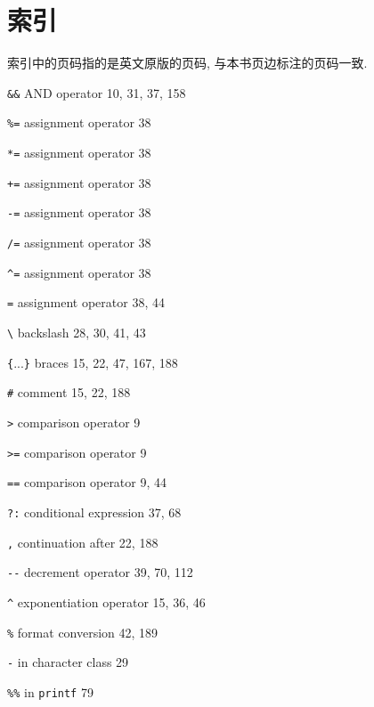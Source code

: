 \chapter{索引}
\label{chap:index}

索引中的页码指的是英文原版的页码, 与本书页边标注的页码一致.

\begin{multicols}{3}
\small
\hangindent=3pc  \verb'&&' AND operator 10, 31, 37, 158

\hangindent=3pc  \verb'%=' assignment operator 38

\hangindent=3pc  \verb'*=' assignment operator 38

\hangindent=3pc  \verb'+=' assignment operator 38

\hangindent=3pc  \verb'-=' assignment operator 38

\hangindent=3pc  \verb'/=' assignment operator 38

\hangindent=3pc  \verb'^=' assignment operator 38

\hangindent=3pc  \verb'=' assignment operator 38, 44

\hangindent=3pc  \verb'\' backslash 28, 30, 41, 43

\hangindent=3pc  \verb'{'...\verb'}' braces 15, 22, 47, 167, 188

\hangindent=3pc  \verb'#' comment 15, 22, 188

\hangindent=3pc  \verb'>' comparison operator 9

\hangindent=3pc  \verb'>=' comparison operator 9

\hangindent=3pc  \verb'==' comparison operator 9, 44

\hangindent=3pc  \verb'?:' conditional expression 37, 68

\hangindent=3pc  \verb',' continuation after 22, 188

\hangindent=3pc  \verb'--' decrement operator 39, 70, 112

\hangindent=3pc  \verb'^' exponentiation operator 15, 36, 46

\hangindent=3pc  \verb'%' format conversion 42, 189

\hangindent=3pc  \verb'-' in character class 29

\hangindent=3pc  \verb'%%' in \verb'printf' 79


\end{multicols}
